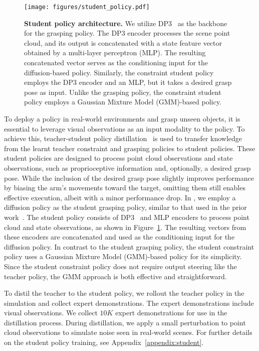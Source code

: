 \begin{figure}
    \centering
    \texttt{[image: figures/student\_policy.pdf]}
    \caption{\textbf{Student policy architecture.} We utilize DP3~\cite{ze20243d} as the backbone for the grasping policy. The DP3 encoder processes the scene point cloud, and its output is concatenated with a state feature vector obtained by a multi-layer perceptron (MLP). The resulting concatenated vector serves as the conditioning input for the diffusion-based policy. Similarly, the constraint student policy employs the DP3 encoder and an MLP, but it takes a desired grasp pose as input. Unlike the grasping policy, the constraint student policy employs a Gaussian Mixture Model (GMM)-based policy.}
    \label{fig:student_arch}
    \vspace{-0.3cm}
\end{figure}

To deploy a policy in real-world environments and grasp unseen objects, it is essential to leverage visual observations as an input modality to the policy. 
To achieve this, teacher-student policy distillation~\cite{yamada2024twist, brosseit2021distilled} is used to transfer knowledge from the learnt teacher constraint and grasping policies to student policies. 
These student policies are designed to process point cloud observations and state observations, such as proprioceptive information and, optionally, a desired grasp pose. 
While the inclusion of the desired grasp pose slightly improves performance by biasing the arm's movements toward the target, omitting them still enables effective execution, albeit with a minor performance drop.
In \ourmethod, we employ a diffusion policy as the student grasping policy, similar to that used in the prior work~\cite{ze20243d}.
The student policy consists of DP3~\cite{ze20243d} and MLP encoders to process point cloud and state observations, as shown in Figure~\ref{fig:student_arch}.
The resulting vectors from these encoders are concatenated and used as the conditioning input for the diffusion policy.
In contrast to the student grasping policy, the student constraint policy uses a Gaussian Mixture Model (GMM)-based policy for its simplicity. 
Since the student constraint policy does not require output steering like the teacher policy, the GMM approach is both effective and straightforward.

To distil the teacher to the student policy, we rollout the teacher policy in the simulation and collect expert demonstrations.
The expert demonstrations include visual observations.
We collect $10K$ expert demonstrations for use in the distillation process.
During distillation, we apply a small perturbation to point cloud observations to simulate noise seen in real-world scenes.
For further details on the student policy training, see Appendix~\ref{appendix:student}.


